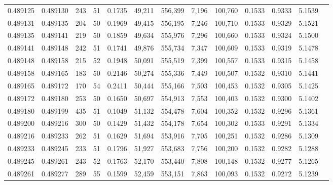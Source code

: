 \begin{tabular}{rrrrrrrrrrrrr}
0.489125 & 0.489130 & 243 &  51 &                                     0.1735 &  49,211 & 556,399 &   7,196 & 100,760 & 0.1533 & 0.9333 & 5.1539 \\
0.489131 & 0.489135 & 204 &  50 &                                     0.1969 &  49,415 & 556,195 &   7,246 & 100,710 & 0.1533 & 0.9329 & 5.1521 \\
0.489135 & 0.489141 & 219 &  50 &                                     0.1859 &  49,634 & 555,976 &   7,296 & 100,660 & 0.1533 & 0.9324 & 5.1500 \\
0.489141 & 0.489148 & 242 &  51 &                                     0.1741 &  49,876 & 555,734 &   7,347 & 100,609 & 0.1533 & 0.9319 & 5.1478 \\
0.489148 & 0.489158 & 215 &  52 &                                     0.1948 &  50,091 & 555,519 &   7,399 & 100,557 & 0.1533 & 0.9315 & 5.1458 \\
0.489158 & 0.489165 & 183 &  50 &                                     0.2146 &  50,274 & 555,336 &   7,449 & 100,507 & 0.1532 & 0.9310 & 5.1441 \\
0.489165 & 0.489172 & 170 &  54 &                                     0.2411 &  50,444 & 555,166 &   7,503 & 100,453 & 0.1532 & 0.9305 & 5.1425 \\
0.489172 & 0.489180 & 253 &  50 &                                     0.1650 &  50,697 & 554,913 &   7,553 & 100,403 & 0.1532 & 0.9300 & 5.1402 \\
0.489180 & 0.489199 & 435 &  51 &                                     0.1049 &  51,132 & 554,478 &   7,604 & 100,352 & 0.1532 & 0.9296 & 5.1361 \\
0.489200 & 0.489216 & 300 &  50 &                                     0.1429 &  51,432 & 554,178 &   7,654 & 100,302 & 0.1533 & 0.9291 & 5.1334 \\
0.489216 & 0.489233 & 262 &  51 &                                     0.1629 &  51,694 & 553,916 &   7,705 & 100,251 & 0.1532 & 0.9286 & 5.1309 \\
0.489233 & 0.489245 & 233 &  51 &                                     0.1796 &  51,927 & 553,683 &   7,756 & 100,200 & 0.1532 & 0.9282 & 5.1288 \\
0.489245 & 0.489261 & 243 &  52 &                                     0.1763 &  52,170 & 553,440 &   7,808 & 100,148 & 0.1532 & 0.9277 & 5.1265 \\
0.489261 & 0.489277 & 289 &  55 &                                     0.1599 &  52,459 & 553,151 &   7,863 & 100,093 & 0.1532 & 0.9272 & 5.1239 \\

\end{tabular}
